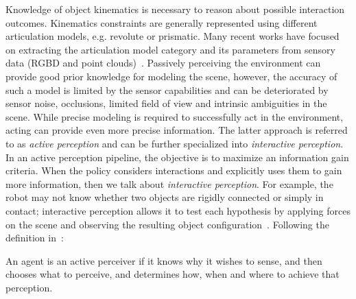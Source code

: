 Knowledge of object kinematics is necessary to reason about possible interaction outcomes. Kinematics constraints are generally represented using different articulation models, e.g. revolute or prismatic. Many recent works have focused on extracting the articulation model category and its parameters from sensory data (RGBD and point clouds)~\cite{abbatematteo2019learning, li2020category}. 
Passively perceiving the environment can provide good prior knowledge for modeling the scene, however, the accuracy of such a model is limited by the sensor capabilities and can be deteriorated by sensor noise, occlusions, limited field of view and intrinsic ambiguities in the scene. While precise modeling is required to successfully act in the environment, acting can provide even more precise information. The latter approach is referred to as \emph{active perception} and can be further specialized into \emph{interactive perception}. In an active perception pipeline, the objective is to maximize an information gain criteria. When the policy considers interactions and explicitly uses them to gain more information, then we talk about \emph{interactive perception}. For example, the robot may not know whether two objects are rigidly connected or simply in contact; interactive perception allows it to test each hypothesis by applying forces on the scene and observing the resulting object configuration~\citep{kroemer2019review}. Following the definition in~\cite{bajcsy2018revisiting}:
\begin{displayquote}
An agent is an active perceiver if it knows why it wishes to sense, and then chooses what to perceive, and determines how, when and where to achieve that perception.
\end{displayquote}  

